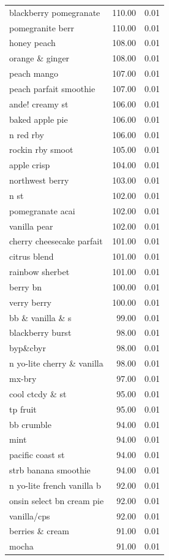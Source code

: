 \begin{table}
\begin{tabular}{lrr}
blackberry pomegranate & 110.00 & 0.01 \\
pomegranite berr & 110.00 & 0.01 \\
honey peach & 108.00 & 0.01 \\
orange \& ginger & 108.00 & 0.01 \\
peach mango & 107.00 & 0.01 \\
peach parfait smoothie & 107.00 & 0.01 \\
ande! creamy st & 106.00 & 0.01 \\
baked apple pie & 106.00 & 0.01 \\
n red rby & 106.00 & 0.01 \\
rockin rby smoot & 105.00 & 0.01 \\
apple crisp & 104.00 & 0.01 \\
northwest berry & 103.00 & 0.01 \\
n st & 102.00 & 0.01 \\
pomegranate acai & 102.00 & 0.01 \\
vanilla pear & 102.00 & 0.01 \\
cherry cheesecake parfait & 101.00 & 0.01 \\
citrus blend & 101.00 & 0.01 \\
rainbow sherbet & 101.00 & 0.01 \\
berry bn & 100.00 & 0.01 \\
verry berry & 100.00 & 0.01 \\
bb \& vanilla \& s & 99.00 & 0.01 \\
blackberry burst & 98.00 & 0.01 \\
byp\&cbyr & 98.00 & 0.01 \\
n yo-lite cherry \& vanilla & 98.00 & 0.01 \\
mx-bry & 97.00 & 0.01 \\
cool ctcdy \& st & 95.00 & 0.01 \\
tp fruit & 95.00 & 0.01 \\
bb crumble & 94.00 & 0.01 \\
mint & 94.00 & 0.01 \\
pacific coast st & 94.00 & 0.01 \\
strb banana smoothie & 94.00 & 0.01 \\
n yo-lite french vanilla b & 92.00 & 0.01 \\
onsin select bn cream pie & 92.00 & 0.01 \\
vanilla/cps & 92.00 & 0.01 \\
berries \& cream & 91.00 & 0.01 \\
mocha & 91.00 & 0.01 \\

\end{tabular}
\end{table}
